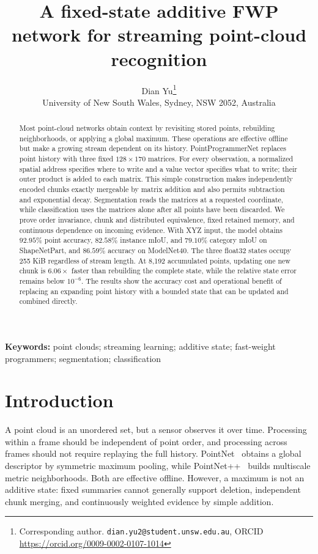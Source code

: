 \documentclass[11pt,a4paper]{article}
\title{\bfseries A fixed-state additive FWP network for streaming point-cloud
recognition}
\author{Dian Yu\thanks{Corresponding author. \texttt{dian.yu2@student.unsw.edu.au},
ORCID \url{https://orcid.org/0009-0002-0107-1014}}\\[2pt]
\normalsize University of New South Wales, Sydney, NSW 2052, Australia}
\date{}
\begin{document}
\maketitle

\begin{abstract}
\noindent
Most point-cloud networks obtain context by revisiting stored points, rebuilding neighborhoods, or applying a global maximum. These operations are effective offline but make a growing stream dependent on its history. PointProgrammerNet replaces point history with three fixed $128\times170$ matrices. For every observation, a normalized spatial address specifies where to write and a value vector specifies what to write; their outer product is added to each matrix. This simple construction makes independently encoded chunks exactly mergeable by matrix addition and also permits subtraction and exponential decay. Segmentation reads the matrices at a requested coordinate, while classification uses the matrices alone after all points have been discarded. We prove order invariance, chunk and distributed equivalence, fixed retained memory, and continuous dependence on incoming evidence. With XYZ input, the model obtains $92.95\%$ point accuracy, $82.58\%$ instance mIoU, and $79.10\%$ category mIoU on ShapeNetPart, and $86.59\%$ accuracy on ModelNet40. The three float32 states occupy 255 KiB regardless of stream length. At 8,192 accumulated points, updating one new chunk is $6.06\times$ faster than rebuilding the complete state, while the relative state error remains below $10^{-6}$. The results show the accuracy cost and operational benefit of replacing an expanding point history with a bounded state that can be updated and combined directly.
\end{abstract}

\noindent\textbf{Keywords:} point clouds; streaming learning; additive state;
fast-weight programmers; segmentation; classification

\section{Introduction}
A point cloud is an unordered set, but a sensor observes it over time. Processing within a frame should be independent of point order, and processing across frames should not require replaying the full history. PointNet~\cite{qi2017pointnet} obtains a global descriptor by symmetric maximum pooling, while PointNet++~\cite{qi2017pointnetplusplus} builds multiscale metric neighborhoods. Both are effective offline. However, a maximum is not an additive state: fixed summaries cannot generally support deletion, independent chunk merging, and continuously weighted evidence by simple addition.
\end{document}
